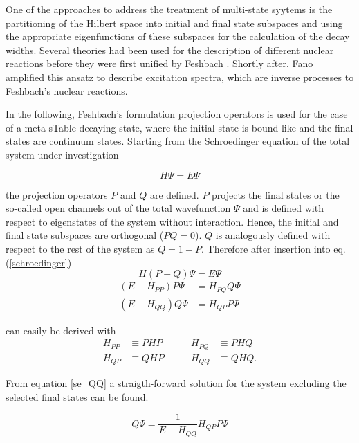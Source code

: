 One of the approaches to address the treatment of multi-state syytems is the
partitioning of the Hilbert space into initial and final
state subspaces and using the appropriate eigenfunctions of these subspaces for the
calculation of the decay widths. 
Several theories had been used for the description of different nuclear reactions
before they were first unified by Feshbach \cite{Feshbach58,Feshbach62,Feshbach_book}.
Shortly after,
Fano amplified this ansatz to describe excitation spectra, which
are inverse processes to Feshbach's nuclear reactions.\cite{Fano61}


In the following, Feshbach's formulation projection
operators is used for the case of a meta-sTable decaying state, where the initial state
is bound-like and the final states are continuum states.
Starting from the Schroedinger equation of the total system under investigation

\begin{equation}
  H \Psi = E \Psi \label{schroedinger}
\end{equation}

the projection operators $P$ and $Q$ are defined. $P$ projects the final states
or the so-called open channels out
of the total wavefunction $\Psi$ and is defined with respect to eigenstates
of the system without interaction. Hence, the initial and final state subspaces
are orthogonal ($PQ=0$).
$Q$ is analogously defined with respect to the rest of the
system as $Q = 1 - P$. Therefore after insertion into eq. (\ref{schroedinger})
\begin{equation}
  H (P+Q) \Psi = E \Psi
\end{equation}
\begin{align}
  (E - H_{PP}) P \Psi & = H_{PQ} Q \Psi \label{se_PP}\\
  (E - H_{QQ}) Q \Psi & = H_{QP} P \Psi \label{se_QQ}
\end{align}

can easily be derived with
\begin{align*}
  H_{PP} & \equiv PHP & \quad\quad H_{PQ} & \equiv PHQ\\
  H_{QP} & \equiv QHP & \quad\quad H_{QQ} & \equiv QHQ .
\end{align*}

From equation \ref{se_QQ} a straigth-forward solution for the system excluding
the selected final states can be found.

\begin{equation}
  Q \Psi = \frac{1}{E-H_{QQ}} H_{QP} P \Psi \label{feshbach_qpsi}
\end{equation}

